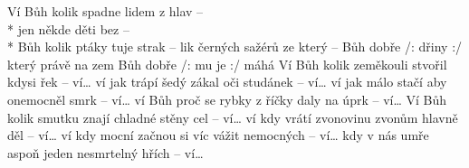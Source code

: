 \begin{TEXT}{Ví}
\SLOKA {} Bůh kolik  spadne  lidem z hlav \NL\hspace*{1cm}--    \\*
 jen někde  děti  bez  \NL\hspace*{1cm}--     \\*
 Bůh kolik  ptáky tuje strak --    \NL
{}lik černých sažérů ze který  --    
\REFREN     Bůh dobře /:  dřiny :/ \NL
{} který právě na zem  \NL
Bůh dobře /:            mu je :/ \NL
{}máhá    
\SLOKA Ví Bůh kolik zeměkouli stvořil kdysi řek -- ví… \NL
ví jak trápí šedý zákal oči studánek -- ví… \NL
ví jak málo stačí aby onemocněl smrk -- ví… \NL
ví Bůh proč se rybky z říčky daly na úprk -- ví… 
\SLOKA Ví Bůh kolik smutku znají chladné stěny cel -- ví… \NL
ví kdy vrátí zvonovinu zvonům hlavně děl -- ví… \NL
ví kdy mocní začnou si víc vážit nemocných -- ví… \NL
kdy v nás umře aspoň jeden nesmrtelný hřích -- ví… \NL
\end{TEXT}
